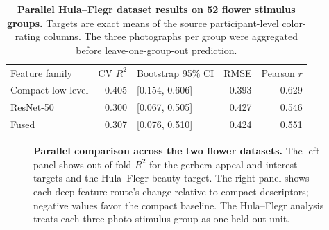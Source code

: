 \documentclass[10pt,letterpaper]{article}
\newlength\savedwidth
\newcommand\thickhline{\noalign{\global\savedwidth\arrayrulewidth\global\arrayrulewidth 2pt}\hline\noalign{\global\arrayrulewidth\savedwidth}}
\begin{document}
\begin{table}[!ht]
\centering
\caption{\textbf{Parallel Hula--Flegr dataset results on 52 flower stimulus groups.} Targets are exact means of the source participant-level color-rating columns. The three photographs per group were aggregated before leave-one-group-out prediction.}
\begin{tabular}{l r l r r}
\hline
Feature family & CV $R^2$ & Bootstrap 95\% CI & RMSE & Pearson $r$\\ \thickhline
Compact low-level & 0.405 & [0.154, 0.606] & 0.393 & 0.629\\
ResNet-50 & 0.300 & [0.067, 0.505] & 0.427 & 0.546\\
Fused & 0.307 & [0.076, 0.510] & 0.424 & 0.551\\ \hline
\end{tabular}
\label{table_external}
\end{table}

\begin{figure}[!h]
\caption{\textbf{Parallel comparison across the two flower datasets.} The left panel shows out-of-fold $R^2$ for the gerbera appeal and interest targets and the Hula--Flegr beauty target. The right panel shows each deep-feature route's change relative to compact descriptors; negative values favor the compact baseline. The Hula--Flegr analysis treats each three-photo stimulus group as one held-out unit. }
\label{fig:external}
\end{figure}
\end{document}
